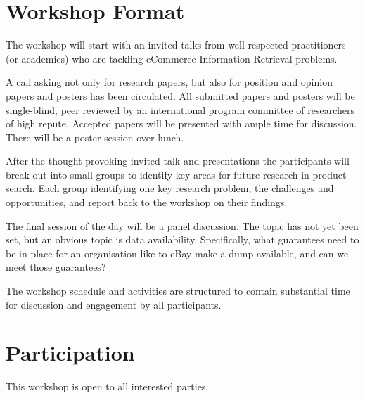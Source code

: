 \documentclass[sigconf]{acmart}
\begin{document}
\section{Workshop Format}

The workshop will start with an invited talks from  well respected
practitioners (or academics) who are tackling eCommerce Information Retrieval problems.

A call asking not only for research papers, but also for position and opinion papers and posters
has been circulated.  All submitted papers and posters will be single-blind, peer reviewed by an
international program committee of researchers of high repute.  Accepted
papers will be presented with ample time for discussion.  There will be a poster session over lunch.

After the thought provoking invited talk and presentations the participants
will break-out into small groups to identify key areas for future
research in product search. Each group identifying one key research
problem, the challenges and opportunities, and report back to the
workshop on their findings.

The final session of the day will be a panel discussion.  The topic has
not yet been set, but an obvious topic is data availability.
Specifically, what guarantees need to be in place for an organisation
like to eBay make a dump available, and can we meet those guarantees?

The workshop schedule and activities are structured to contain
substantial time for discussion and engagement by all participants.

\section{Participation}
This workshop is open to all interested parties.
\end{document}
